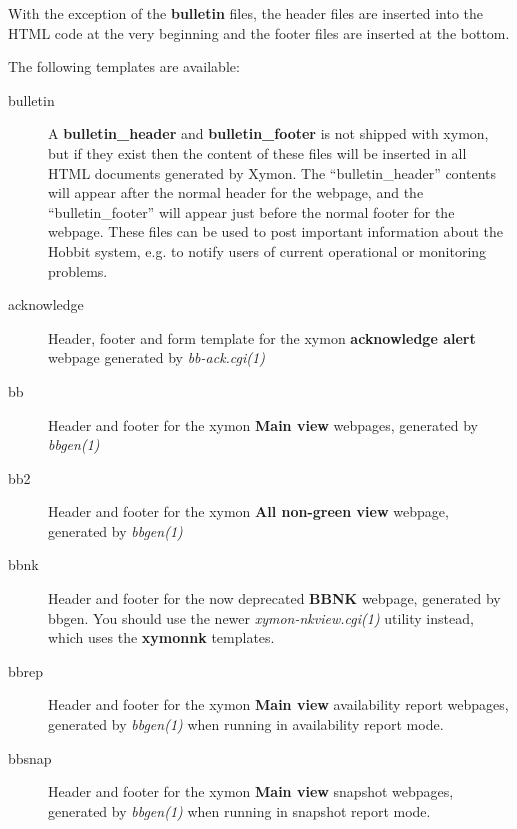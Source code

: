   With the exception of the \textbf{bulletin}
 files, the header files are inserted into the HTML code at the very beginning and the footer files are inserted at the bottom. 


  The following templates are available: 


 \begin{description}
\item[bulletin] A \textbf{bulletin\_header}
 and \textbf{bulletin\_footer}
 is not shipped with xymon, but if they exist then the content of these files will be inserted in all HTML documents generated by Xymon. The ``bulletin\_header'' contents will appear after the normal header for the webpage, and the ``bulletin\_footer'' will appear just before the normal footer for the webpage. These files can be used to post important information about the Hobbit system, e.g. to notify users of current operational or monitoring problems. 

 

\item[acknowledge] Header, footer and form template for the xymon \textbf{acknowledge alert}
 webpage generated by \emph{bb-ack.cgi(1)}


 

\item[bb] Header and footer for the xymon \textbf{Main view}
 webpages, generated by \emph{bbgen(1)}


 

\item[bb2] Header and footer for the xymon \textbf{All non-green view}
 webpage, generated by \emph{bbgen(1)}


 

\item[bbnk] Header and footer for the now deprecated \textbf{BBNK}
 webpage, generated by bbgen. You should use the newer \emph{xymon-nkview.cgi(1)}
 utility instead, which uses the \textbf{xymonnk}
 templates. 

 

\item[bbrep] Header and footer for the xymon \textbf{Main view}
 availability report webpages, generated by \emph{bbgen(1)}
 when running in availability report mode. 

 

\item[bbsnap] Header and footer for the xymon \textbf{Main view}
 snapshot webpages, generated by \emph{bbgen(1)}
 when running in snapshot report mode. 


\end{description}
